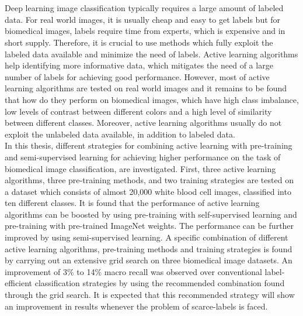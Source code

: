 \chapter{\abstractname}\label{abstract}
Deep learning image classification typically requires a large amount of labeled data. For real world images, it is usually cheap and easy to get labels but for biomedical images, labels require time from experts, which is expensive and in short supply. Therefore, it is crucial to use methods which fully exploit the labeled data available and minimize the need of labels. Active learning algorithms help identifying more informative data, which mitigates the need of a large number of labels for achieving good performance. However, most of active learning algorithms are tested on real world images and it remains to be found that how do they perform on biomedical images, which have high class imbalance, low levels of contrast between different colors and a high level of similarity between different classes. Moreover, active learning algorithms usually do not exploit the unlabeled data available, in addition to labeled data. \\
In this thesis, different strategies for combining active learning with pre-training and semi-supervised learning for achieving higher performance on the task of biomedical image classification, are investigated. First, three active learning algorithms, three pre-training methods, and two training strategies are tested on a dataset which consists of almost 20,000 white blood cell images, classified into ten different classes. It is found that the performance of active learning algorithms can be boosted by using pre-training with self-supervised learning and pre-training with pre-trained ImageNet weights. The performance can be further improved by using semi-supervised learning. A specific combination of different active learning algorithms, pre-training methods and training strategies is found by carrying out an extensive grid search on three biomedical image datasets. An improvement of 3\% to 14\% macro recall was observed over conventional label-efficient classification strategies by using the recommended combination found through the grid search. It is expected that this recommended strategy will show an improvement in results whenever the problem of scarce-labels is faced.


